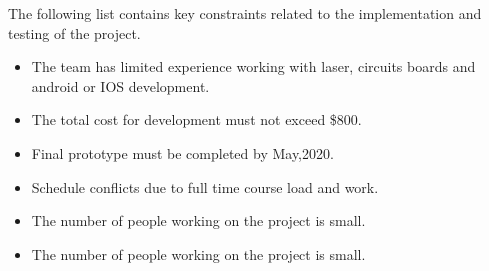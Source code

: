 The following list contains key constraints related to the implementation and testing of the project.

\begin{itemize}
  \item The team has limited experience working with laser, circuits boards and android or IOS development.
  \item The total cost for development must not exceed \$800.
  \item Final prototype must be completed by May,2020.
  \item Schedule conflicts due to full time course load and work.
  \item The number of people working on the project is small.
  \item The number of people working on the project is small.
\end{itemize}
